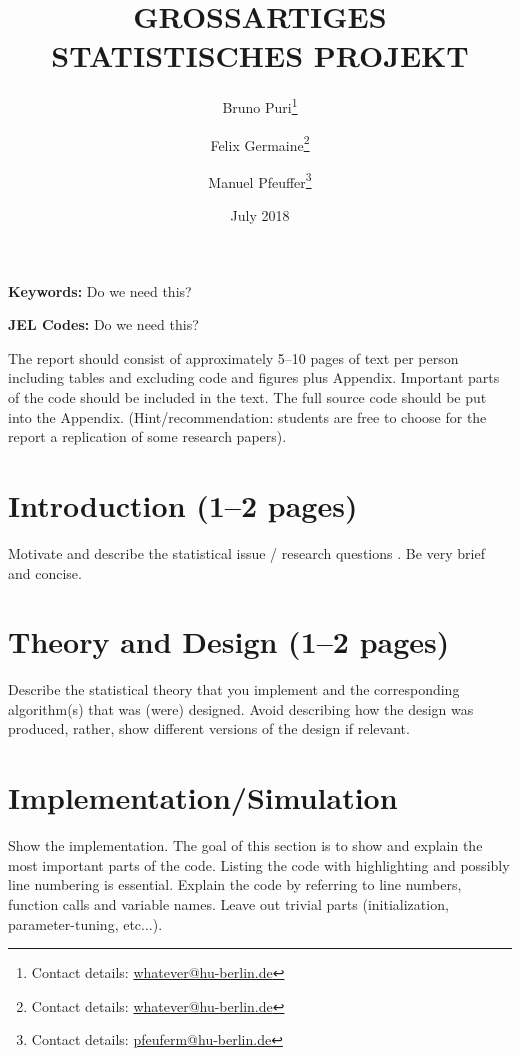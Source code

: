 \documentclass[a4paper,12pt,notitlepage]{article}
\title{GROSSARTIGES STATISTISCHES PROJEKT}
\author{Bruno Puri\footnote{Contact details: \url{whatever@hu-berlin.de}} \and  Felix Germaine\footnote{Contact details: \url{whatever@hu-berlin.de}} \and Manuel Pfeuffer\footnote{Contact details: \url{pfeuferm@hu-berlin.de}}}
\date{July 2018}
\begin{document}
\maketitle

\begin{abstract}

\noindent \lipsum[10]

\end{abstract}

\noindent\textbf{Keywords:} Do we need this?

\noindent\textbf{JEL Codes:} Do we need this?
\newpage

\tableofcontents
\newpage

\noindent The report should consist of approximately 5--10 pages of text per person
including tables and excluding code and figures plus Appendix. Important 
parts of the code should be included in the  text.  The  full  source
code  should  be  put  into the  Appendix. (Hint/recommendation: students
are free to choose for the report a replication of some research papers). 

\section{Introduction (1--2 pages)}
Motivate and describe the statistical issue / research questions .
Be very brief and concise. 

\section{Theory and Design (1--2 pages)}
Describe the statistical theory that you implement and the corresponding 
algorithm(s) that was (were)  designed. Avoid  describing how  the  design  
was  produced,  rather,  show  different versions of the design if relevant.

\section{Implementation/Simulation}
Show the implementation. The goal of this section is to show and explain
the most important parts of  the code. Listing the code with highlighting
and possibly line numbering is essential. Explain the code by referring to
line numbers, function calls and variable names. Leave out trivial parts 
(initialization, parameter-tuning, etc...).
\end{document}
